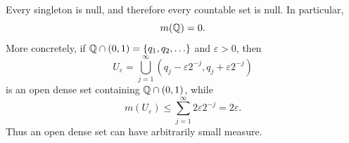 \begin{example}
  Every singleton is null, and therefore every countable set is null.
  In particular,
  \[
    m(\mathbb{Q})=0.
  \]
  More concretely, if
  $\mathbb{Q}\cap(0,1)=\{q_1,q_2,\ldots\}$ and $\varepsilon>0$, then
  \[
    U_\varepsilon
    =\bigcup_{j=1}^{\infty}
      (q_j-\varepsilon2^{-j},q_j+\varepsilon2^{-j})
  \]
  is an open dense set containing $\mathbb{Q}\cap(0,1)$, while
  \[
    m(U_\varepsilon)
    \leq\sum_{j=1}^{\infty}2\varepsilon2^{-j}
    =2\varepsilon.
  \]
  Thus an open dense set can have arbitrarily small measure.
\end{example}
